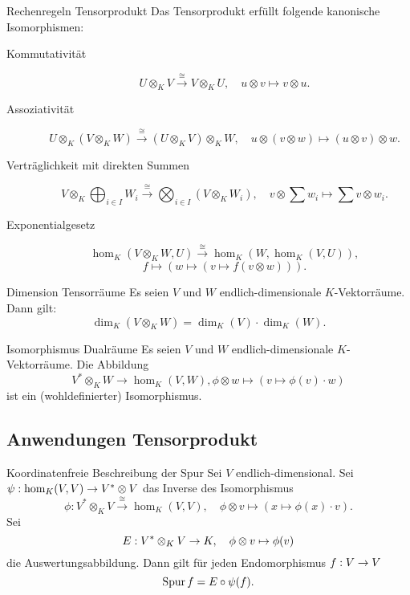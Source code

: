 \documentclass[main.tex]{subfiles}
\begin{document}
\begin{karte}{Rechenregeln Tensorprodukt}
    Das Tensorprodukt erfüllt folgende kanonische Isomorphismen:
    \begin{description}
        \item[Kommutativität] 
        \[ U \otimes_K V \overset{\cong}{\longrightarrow} V \otimes_K U, \quad
        u \otimes v \mapsto v\otimes u. \]
        \item[Assoziativität]
        \[ U \otimes_K (V \otimes_K W) \overset{\cong}{\longrightarrow} 
        ( U \otimes_K V ) \otimes_K W, \quad 
        u \otimes (v\otimes w) \mapsto (u\otimes v) \otimes w. \]
        \item[Verträglichkeit mit direkten Summen]
        \[ V \otimes_K \bigoplus_{i\in I} W_i \overset{\cong}{\longrightarrow} 
        \bigotimes_{i \in I} (V \otimes_K W_i), \quad 
        v \otimes \sum w_i \mapsto \sum v \otimes w_i. \] 
        \item[Exponentialgesetz]
        \[ \hom_K(V \otimes_K W, U) \overset{\cong}{\longrightarrow} 
        \hom_K(W, \hom_K(V, U)), \]
        \[ f \mapsto \left(w \mapsto (v\mapsto f(v\otimes w))\right). \]
    \end{description}
\end{karte}

\begin{karte}{Dimension Tensorräume}
    Es seien \(V\) und \(W\) endlich-dimensionale \(K\)-Vektorräume. 
    Dann gilt:
    \[ \dim_K (V \otimes_K W) = \dim_K(V) \cdot \dim_K(W). \]
\end{karte}

\begin{karte}{Isomorphismus Dualräume}
    Es seien \(V\) und \(W\) endlich-dimensionale \(K\)-Vektorräume. Die 
    Abbildung 
    \[ V^* \otimes_K W \rightarrow \hom_K(V,W), 
    \phi \otimes w \mapsto (v\mapsto \phi(v) \cdot w) \]
    ist ein (wohldefinierter) Isomorphismus.
\end{karte}

\subsection*{Anwendungen Tensorprodukt}

\begin{karte}{Koordinatenfreie Beschreibung der Spur}
    Sei \(V\) endlich-dimensional. Sei \( \psi : \hom_K(V,V) \rightarrow V^* \otimes V \) 
    das Inverse des Isomorphismus 
    \[ \phi:V^* \otimes_K V\overset{\cong}{\longrightarrow} \hom_K(V,V), \quad 
    \phi \otimes v \mapsto (x \mapsto \phi(x) \cdot v). \]
    Sei 
    \[ E : V^* \otimes_K V \rightarrow K, \quad \phi \otimes v \mapsto \phi(v) \] 
    die Auswertungsabbildung. Dann gilt für jeden Endomorphismus 
    \( f : V \rightarrow V \) 
    \[ \operatorname{Spur} f = E \circ \psi(f). \]
\end{karte}
\end{document}
